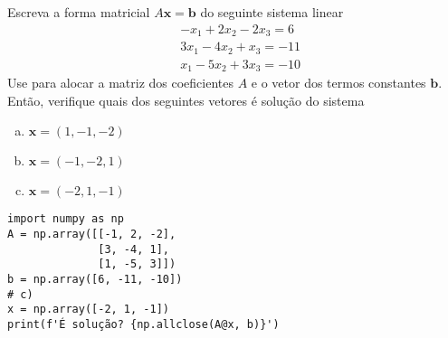 \begin{exer}\label{cap_arr_sec_mat:exer:sislin}
  Escreva a forma matricial $A\pmb{x} = \pmb{b}$ do seguinte sistema linear
  \begin{subequations}
    \begin{align}
      & -x_1 + 2x_2 - 2x_3 = 6 \\
      & 3x_1 - 4x_2 + x_3 = -11 \\
      & x_1 -5x_2 + 3x_3 = -10
    \end{align}
  \end{subequations}
  Use {\PYTHONnumpyDOTarray} para alocar a matriz dos coeficientes $A$ e o vetor dos termos constantes $\pmb{b}$. Então, verifique quais dos seguintes vetores é solução do sistema
  \begin{enumerate}[a)]
  \item $\pmb{x} = (1, -1, -2)$
  \item $\pmb{x} = (-1, -2, 1)$
  \item $\pmb{x} = (-2, 1, -1)$
  \end{enumerate}
\end{exer}
\begin{resp}

\begin{lstlisting}
import numpy as np
A = np.array([[-1, 2, -2],
              [3, -4, 1],
              [1, -5, 3]])
b = np.array([6, -11, -10])
# c)
x = np.array([-2, 1, -1])
print(f'É solução? {np.allclose(A@x, b)}')
\end{lstlisting}

\end{resp}

